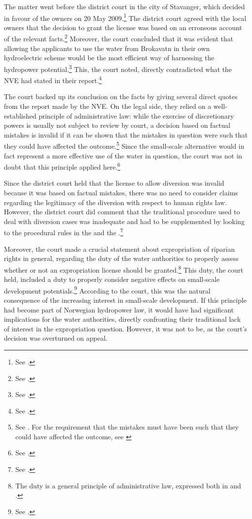 The matter went before the district court in the city of Stavanger, which decided in favour of the owners on 20 May 2009.\footnote{See \cite{jorpeland09}.} The district court agreed with the local  owners that the decision to grant the license was based on an erroneous account of the relevant facts.\footnote{See \cite[25]{jorpeland11}.} Moreover, the court concluded that it was evident that allowing the applicants to use the water from Brokavatn in their own hydroelectric scheme would be the most efficient way of harnessing the hydropower potential.\footnote{See \cite[22-23]{jorpeland09}.} This, the court noted, directly contradicted what the NVE had stated in their report.\footnote{See \cite[23]{jorpeland09}.}

The court backed up its conclusion on the facts by giving several direct quotes from the report made by the NVE. On the legal side, they relied on a well-established principle of administrative law: while the exercise of discretionary powers is usually not subject to review by court, a decision based on factual mistakes is invalid if it can be shown that the mistakes in question were such that they could have affected the outcome.\footnote{See \cite[407-410]{eckhoff14}. For the requirement that the mistakes must have been such that they could have affected the outcome, see \cite[41]{paa67}} Since the small-scale alternative would in fact represent a more effective use of the water in question, the court was not in doubt that this principle applied here.\footnote{See \cite[25]{jorpeland09}.}

Since the district court held that the license to allow diversion was invalid because it was based on factual mistakes, there was no need to consider claims regarding the legitimacy of the diversion with respect to human rights law. However, the district court did comment that the traditional procedure used to deal with diversion cases was inadequate and had to be supplemented by looking to the procedural rules in the \cite{ea59} and the \cite{paa67}.\footnote{See \cite[21]{jorpeland09}.} 

Moreover, the court made a crucial statement about expropriation of riparian rights in general, regarding the duty of the water authorities to properly assess whether or not an expropriation license should be granted.\footnote{The duty is a general principle of administrative law, expressed both in \cite[12]{ea59} and \cite[16]{paa67}.} This duty, the court held, included a duty to properly consider negative effects on small-scale development potentials.\footnote{See \cite[22]{jorpeland09}.} According to the court, this was the natural consequence of the increasing interest in small-scale development. If this principle had become part of Norwegian hydropower law, it would have had significant implications for the water authorities, directly confronting their traditional lack of interest in the expropriation question. However, it was not to be, as the court's decision was overturned on appeal.

